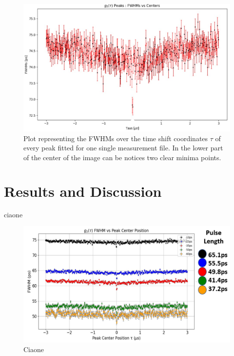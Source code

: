 \begin{figure}[hbtp]
\centering
\includegraphics[width=1\textwidth]{FWHMvsTAU_Single.jpg}
\caption{Plot representing the FWHMs over the time shift coordinates $\tau$ of every peak fitted for one single measurement file. In the lower part of the center of the image can be notices two clear minima points.}
\label{FWHMvsTauSingle}
\end{figure}


\section{Results and Discussion}
\label{EOMresults}
ciaone

\begin{figure}[hbtp]
\centering
\includegraphics[width=1\textwidth]{FWHMvsTAU_ALL_Version2.jpg}
\caption{Ciaone}
\label{FWHMvsTauGeneral}
\end{figure}

